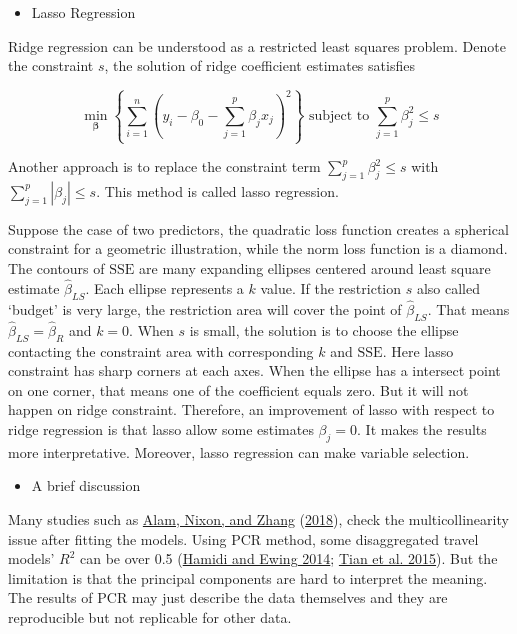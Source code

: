 \documentclass[
  11pt,
  openany]{memoir}
\providecommand{\tightlist}{%
  \setlength{\itemsep}{0pt}\setlength{\parskip}{0pt}}
\begin{document}
\begin{itemize}
\tightlist
\item
  Lasso Regression
\end{itemize}

Ridge regression can be understood as a restricted least squares problem. Denote the constraint \(s\), the solution of ridge coefficient estimates satisfies

\begin{equation}
\min_{\boldsymbol\beta}\left\{\sum_{i=1}^n\left(y_i-\beta_0-\sum_{j=1}^p\beta_jx_j\right)^2\right\}\text{ subject to } \sum_{j=1}^p\beta_j^2\le s
\end{equation}

Another approach is to replace the constraint term \(\sum_{j=1}^p\beta_j^2\le s\) with \(\sum_{j=1}^p|\beta_j|\le s\). This method is called lasso regression.

Suppose the case of two predictors, the quadratic loss function creates a spherical constraint for a geometric illustration, while the norm loss function is a diamond. The contours of \(\mathrm{SSE}\) are many expanding ellipses centered around least square estimate \(\hat\beta_{LS}\). Each ellipse represents a \(k\) value.
If the restriction \(s\) also called `budget' is very large, the restriction area will cover the point of \(\hat\beta_{LS}\). That means \(\hat\beta_{LS}=\hat\beta_{R}\) and \(k=0\).
When \(s\) is small, the solution is to choose the ellipse contacting the constraint area with corresponding \(k\) and \(\mathrm{SSE}\).
Here lasso constraint has sharp corners at each axes. When the ellipse has a intersect point on one corner, that means one of the coefficient equals zero. But it will not happen on ridge constraint.
Therefore, an improvement of lasso with respect to ridge regression is that lasso allow some estimates \(\beta_j=0\). It makes the results more interpretative. Moreover, lasso regression can make variable selection.

\begin{itemize}
\tightlist
\item
  A brief discussion
\end{itemize}

Many studies such as \protect\hyperlink{ref-alamFactorsAffectingTravel2018}{Alam, Nixon, and Zhang} (\protect\hyperlink{ref-alamFactorsAffectingTravel2018}{2018}), check the multicollinearity issue after fitting the models.
Using PCR method, some disaggregated travel models' \(R^2\) can be over 0.5 (\protect\hyperlink{ref-hamidiLongitudinalStudyChanges2014}{Hamidi and Ewing 2014}; \protect\hyperlink{ref-tianTrafficGeneratedMixedUse2015}{Tian et al. 2015}).
But the limitation is that the principal components are hard to interpret the meaning.
The results of PCR may just describe the data themselves and they are reproducible but not replicable for other data.
\end{document}
